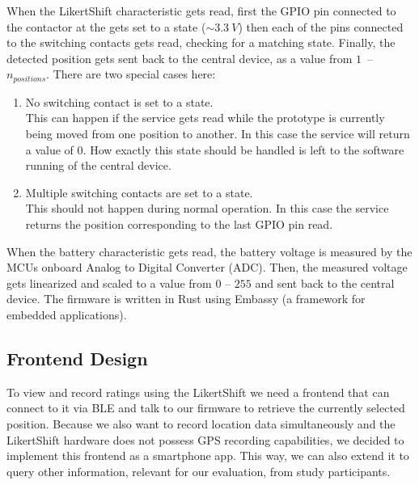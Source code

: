 When the LikertShift characteristic gets read, first the GPIO pin connected to the contactor at the \rotatorhead gets set to a \gpiohigh state ($\sim\SI{3.3}{V}$) then each of the pins connected to the switching contacts gets read, checking for a matching \gpiohigh state.
Finally, the detected position gets sent back to the central device, as a value from \mbox{$1$ -- $n_{positions}$}.
There are two special cases here:
\vspace*{-0.5em}
\begin{enumerate}[label=(\roman*),itemsep=0em]
    \item No switching contact is set to a \gpiohigh state.\\
        This can happen if the service gets read while the prototype is currently being moved from one position to another. In this case the service will return a value of $0$. How exactly this state should be handled is left to the software running of the central device.
    \item Multiple switching contacts are set to a \gpiohigh state.\\
        This should not happen during normal operation. In this case the service returns the position corresponding to the last GPIO pin read.
\end{enumerate}
\vspace*{-0.5em}
\noindent
When the battery characteristic gets read, the battery voltage is measured by the MCUs onboard Analog to Digital Converter (ADC).
Then, the measured voltage gets linearized and scaled to a value from $0$ -- $255$ and sent back to the central device.
\bigbreak\noindent
The firmware is written in Rust using Embassy (a framework for embedded applications).

\subsection{Frontend Design}

To view and record ratings using the LikertShift we need a frontend that can connect to it via BLE and talk to our firmware to retrieve the currently selected position.
Because we also want to record location data simultaneously and the LikertShift hardware does not possess GPS recording capabilities, we decided to implement this frontend as a smartphone app.
This way, we can also extend it to query other information, relevant for our evaluation, from study participants.

